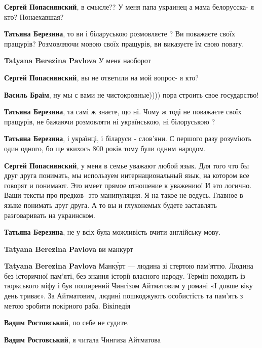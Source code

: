 \begin{itemize}
{\begin{itemize}
\textbf{Сергей Попаснянский}, в смысле?? У меня папа украинец а мама белорусска- я кто? Понаехавшая?

\textbf{Татьяна Березина}, то ви і біларуською розмовляєте ? Ви поважаєте своїх
пращурів? Розмовляючи мовою своїх пращурів, ви виказуєте їм свою повагу.

\textbf{Tatyana Berezina Pavlova} У меня наоборот

\textbf{Сергей Попаснянский}, вы не ответили на мой вопрос- я кто?

\textbf{Василь Браїм}, ну мы с вами не чистокровные)))) пора строить свое государство!

\textbf{Татьяна Березина}, та самі ж знаєте, що ні. Чому ж тоді не поважаєте
своїх пращурів, не бажаючи розмовляти ні українською, ні білоруською ?

\textbf{Татьяна Березина}, і українці, і біларуси - слов'яни. С першого разу
розуміють один одного, бо ще якихось 800 років тому були одним народом.

\textbf{Сергей Попаснянский}, у меня в семье уважают любой язык. Для того что
бы друг друга понимать, мы используем интернациональный язык, на котором все
говорят и понимают. Это имеет прямое отношение к уважению! И это логично. Ваши
тексты про предков- это манипуляция. Я на такое не ведусь. Главное в языке
понимать друг друга. А то вы и глухонемых будете заставлять разговаривать на
украинском.

\textbf{Татьяна Березина}, не у всіх була можливість вчити англійську мову.

\textbf{Tatyana Berezina Pavlova} ви манкурт

\textbf{Tatyana Berezina Pavlova} Манку́рт — людина зі стертою пам'яттю. Людина
без історичної пам'яті, без знання історії власного народу. Термін походить із
тюркського міфу і був поширений Чингізом Айтматовим у романі «І довше віку день
триває». За Айтматовим, людині пошкоджують особистість та пам'ять з метою
зробити покірного раба. Вікіпедія

\textbf{Вадим Ростовський}, по себе не судите.

\textbf{Вадим Ростовський}, я читала Чингиза Айтматова


\end{itemize}}
\end{itemize}
